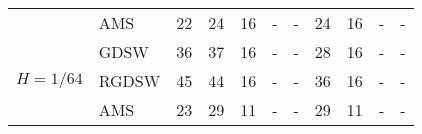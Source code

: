 \begin{table}[H]
\begin{tabular}{llrrrllrrll}
\cline{2-11}
\bfseries  & AMS & 22 & {\cellcolor[HTML]{004529}} \color[HTML]{F1F1F1} 24 & 16 & {\cellcolor[HTML]{BCE395}} \color[HTML]{000000} {\cellcolor[HTML]{ADD8E6}} - & - & {\cellcolor[HTML]{379E54}} \color[HTML]{F1F1F1} 24 & 16 & {\cellcolor[HTML]{FFFFE5}} \color[HTML]{000000} {\cellcolor[HTML]{ADD8E6}} - & - \\
\cline{1-11} \cline{2-11}
\multirow[c]{3}{*}{\bfseries $H=1/64$} & GDSW & 36 & {\cellcolor[HTML]{004529}} \color[HTML]{F1F1F1} 37 & 16 & {\cellcolor[HTML]{BCE395}} \color[HTML]{000000} {\cellcolor[HTML]{ADD8E6}} - & - & {\cellcolor[HTML]{379E54}} \color[HTML]{F1F1F1} 28 & 16 & {\cellcolor[HTML]{FFFFE5}} \color[HTML]{000000} {\cellcolor[HTML]{ADD8E6}} - & - \\
\cline{2-11}
\bfseries  & RGDSW & 45 & {\cellcolor[HTML]{004529}} \color[HTML]{F1F1F1} 44 & 16 & {\cellcolor[HTML]{BCE395}} \color[HTML]{000000} {\cellcolor[HTML]{ADD8E6}} - & - & {\cellcolor[HTML]{379E54}} \color[HTML]{F1F1F1} 36 & 16 & {\cellcolor[HTML]{FFFFE5}} \color[HTML]{000000} {\cellcolor[HTML]{ADD8E6}} - & - \\
\cline{2-11}
\bfseries  & AMS & 23 & {\cellcolor[HTML]{004529}} \color[HTML]{F1F1F1} 29 & 11 & {\cellcolor[HTML]{BCE395}} \color[HTML]{000000} {\cellcolor[HTML]{ADD8E6}} - & - & {\cellcolor[HTML]{379E54}} \color[HTML]{F1F1F1} 29 & 11 & {\cellcolor[HTML]{FFFFE5}} \color[HTML]{000000} {\cellcolor[HTML]{ADD8E6}} - & - \\
\cline{1-11} \cline{2-11}
\bottomrule
\end{tabular}
\end{table}

